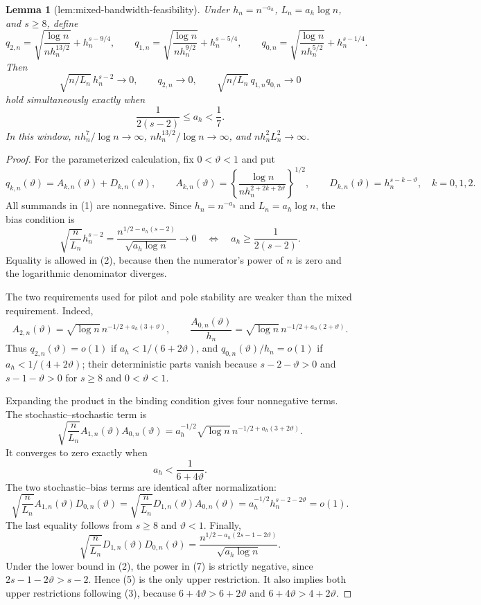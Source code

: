 \documentclass{article}
\newtheorem{lemma}{Lemma}
\begin{document}
\begin{lemma}[lem:mixed-bandwidth-feasibility]\label{lem:mixed-bandwidth-feasibility}
Under \(h_n=n^{-a_h}\), \(L_n=a_h\log n\), and \(s\geq8\), define
\[
 q_{2,n}=\sqrt{\frac{\log n}{n h_n^{13/2}}}+h_n^{s-9/4},\qquad
 q_{1,n}=\sqrt{\frac{\log n}{n h_n^{9/2}}}+h_n^{s-5/4},\qquad
 q_{0,n}=\sqrt{\frac{\log n}{n h_n^{5/2}}}+h_n^{s-1/4}.
\]
Then
\[
 \sqrt{n/L_n}\,h_n^{s-2}\longrightarrow0,\qquad
 q_{2,n}\longrightarrow0,\qquad
 \sqrt{n/L_n}\,q_{1,n}q_{0,n}\longrightarrow0
\]
hold simultaneously exactly when
\[
 \frac{1}{2(s-2)}\leq a_h<\frac17.
\]
In this window, \(n h_n^7/\log n\to\infty\), \(n h_n^{13/2}/\log n\to\infty\), and \(n h_n^2L_n^2\to\infty\).
\end{lemma}
\begin{proof}
For the parameterized calculation, fix \(0<\vartheta<1\) and put
\[
 q_{k,n}(\vartheta)
 =A_{k,n}(\vartheta)+D_{k,n}(\vartheta),\qquad
 A_{k,n}(\vartheta)
 =\left\{\frac{\log n}{n h_n^{2+2k+2\vartheta}}\right\}^{1/2},
 \qquad
 D_{k,n}(\vartheta)=h_n^{s-k-\vartheta},
 \quad k=0,1,2.
\tag{1}
\]
All summands in (1) are nonnegative.  Since \(h_n=n^{-a_h}\) and
\(L_n=a_h\log n\), the bias condition is
\[
 \sqrt{\frac n{L_n}}h_n^{s-2}
 =\frac{n^{1/2-a_h(s-2)}}{\sqrt{a_h\log n}}\longrightarrow0
 \quad\Longleftrightarrow\quad
 a_h\geq\frac1{2(s-2)}.
\tag{2}
\]
Equality is allowed in (2), because then the numerator's power of \(n\) is zero and the logarithmic denominator diverges.

The two requirements used for pilot and pole stability are weaker than the mixed requirement.  Indeed,
\[
 A_{2,n}(\vartheta)
 =\sqrt{\log n}\,n^{-1/2+a_h(3+\vartheta)},
 \qquad
 \frac{A_{0,n}(\vartheta)}{h_n}
 =\sqrt{\log n}\,n^{-1/2+a_h(2+\vartheta)}.
\tag{3}
\]
Thus \(q_{2,n}(\vartheta)=o(1)\) if
\(a_h<1/(6+2\vartheta)\), and
\(q_{0,n}(\vartheta)/h_n=o(1)\) if
\(a_h<1/(4+2\vartheta)\); their deterministic parts vanish because
\(s-2-\vartheta>0\) and \(s-1-\vartheta>0\) for \(s\geq8\) and
\(0<\vartheta<1\).

Expanding the product in the binding condition gives four nonnegative terms.  The stochastic--stochastic term is
\[
 \sqrt{\frac n{L_n}}A_{1,n}(\vartheta)A_{0,n}(\vartheta)
 =a_h^{-1/2}\sqrt{\log n}\,
   n^{-1/2+a_h(3+2\vartheta)}.
\tag{4}
\]
It converges to zero exactly when
\[
 a_h<\frac1{6+4\vartheta}.
\tag{5}
\]
The two stochastic--bias terms are identical after normalization:
\[
 \sqrt{\frac n{L_n}}A_{1,n}(\vartheta)D_{0,n}(\vartheta)
 =\sqrt{\frac n{L_n}}D_{1,n}(\vartheta)A_{0,n}(\vartheta)
 =a_h^{-1/2}h_n^{s-2-2\vartheta}=o(1).
\tag{6}
\]
The last equality follows from \(s\geq8\) and \(\vartheta<1\).  Finally,
\[
 \sqrt{\frac n{L_n}}D_{1,n}(\vartheta)D_{0,n}(\vartheta)
 =\frac{n^{1/2-a_h(2s-1-2\vartheta)}}{\sqrt{a_h\log n}}.
\tag{7}
\]
Under the lower bound in (2), the power in (7) is strictly negative, since
\(2s-1-2\vartheta>s-2\).  Hence (5) is the only upper restriction.  It also implies both upper restrictions following (3), because
\(6+4\vartheta>6+2\vartheta\) and
\(6+4\vartheta>4+2\vartheta\).


\end{proof}
\end{document}
